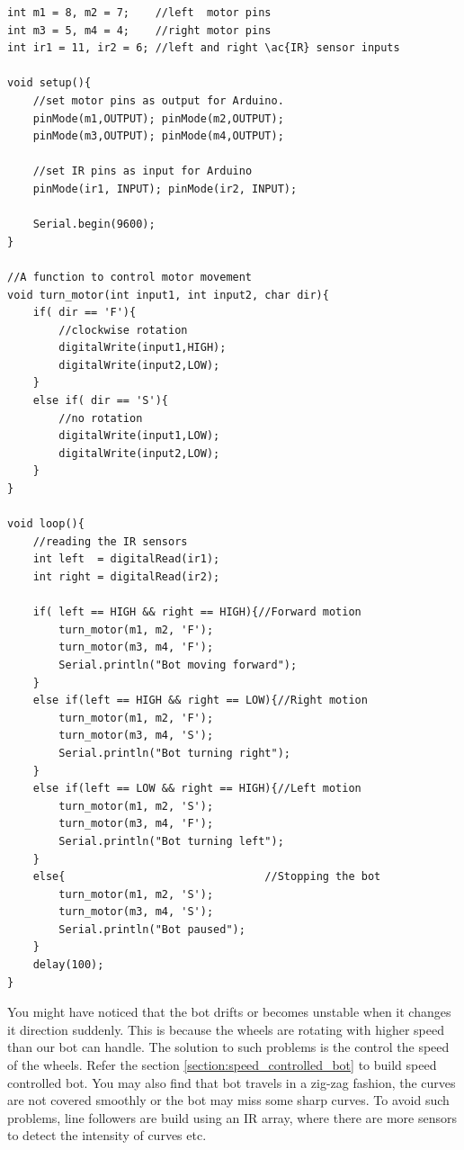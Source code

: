 \begin{lstlisting}[style=CStyle]
int m1 = 8, m2 = 7;    //left  motor pins
int m3 = 5, m4 = 4;    //right motor pins
int ir1 = 11, ir2 = 6; //left and right \ac{IR} sensor inputs

void setup(){
    //set motor pins as output for Arduino.
    pinMode(m1,OUTPUT); pinMode(m2,OUTPUT);
    pinMode(m3,OUTPUT); pinMode(m4,OUTPUT);
    
    //set IR pins as input for Arduino
    pinMode(ir1, INPUT); pinMode(ir2, INPUT);
    
    Serial.begin(9600);
}

//A function to control motor movement
void turn_motor(int input1, int input2, char dir){
    if( dir == 'F'){
        //clockwise rotation
        digitalWrite(input1,HIGH);
        digitalWrite(input2,LOW);
    }
    else if( dir == 'S'){
        //no rotation
        digitalWrite(input1,LOW);
        digitalWrite(input2,LOW);
    }
}

void loop(){
    //reading the IR sensors
    int left  = digitalRead(ir1);
    int right = digitalRead(ir2);
    
    if( left == HIGH && right == HIGH){//Forward motion
        turn_motor(m1, m2, 'F');           
        turn_motor(m3, m4, 'F');           
        Serial.println("Bot moving forward");
    }
    else if(left == HIGH && right == LOW){//Right motion
        turn_motor(m1, m2, 'F'); 
        turn_motor(m3, m4, 'S');
        Serial.println("Bot turning right");
    }
    else if(left == LOW && right == HIGH){//Left motion
        turn_motor(m1, m2, 'S');  
        turn_motor(m3, m4, 'F'); 
        Serial.println("Bot turning left");
    }
    else{								//Stopping the bot
        turn_motor(m1, m2, 'S');
        turn_motor(m3, m4, 'S');
        Serial.println("Bot paused");
    }
    delay(100);
}
\end{lstlisting}

\par You might have noticed that the bot drifts or becomes unstable when it changes it direction suddenly. This is because the wheels are rotating with higher speed than our bot can handle. The solution to such problems is the control the speed of the wheels. Refer the section \ref{section:speed_controlled_bot} to build speed controlled bot. You may also find that bot travels in a zig-zag fashion, the curves are not covered smoothly or the bot may miss some sharp curves. To avoid such problems, line followers are build using an \ac{IR} array, where there are more sensors to detect the intensity of curves etc. 

